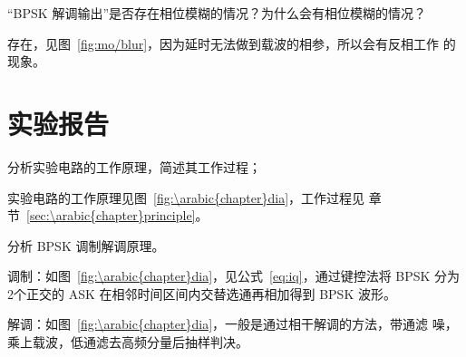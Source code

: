 \documentclass[../main]{subfiles}
\begin{document}
\begin{Exercise}
  “BPSK 解调输出”是否存在相位模糊的情况？为什么会有相位模糊的情况？
\end{Exercise}

\begin{Answer}
  存在，见图~\ref{fig:mo/blur}，因为延时无法做到载波的相参，所以会有反相工作
  的现象。
\end{Answer}

\section{实验报告}%
\label{sec:\arabic{chapter}report}

\begin{Exercise}
  分析实验电路的工作原理，简述其工作过程；
\end{Exercise}

\begin{Answer}
  实验电路的工作原理见图~\ref{fig:\arabic{chapter}dia}，工作过程见
  章节~\ref{sec:\arabic{chapter}principle}。
\end{Answer}

\begin{Exercise}
  分析 BPSK 调制解调原理。
\end{Exercise}

\begin{Answer}
  调制：如图~\ref{fig:\arabic{chapter}dia}，见公式~\ref{eq:iq}，通过键控法将
  BPSK 分为2个正交的 ASK 在相邻时间区间内交替选通再相加得到 BPSK 波形。

  解调：如图~\ref{fig:\arabic{chapter}dia}，一般是通过相干解调的方法，带通滤
  噪，乘上载波，低通滤去高频分量后抽样判决。
\end{Answer}
\end{document}
